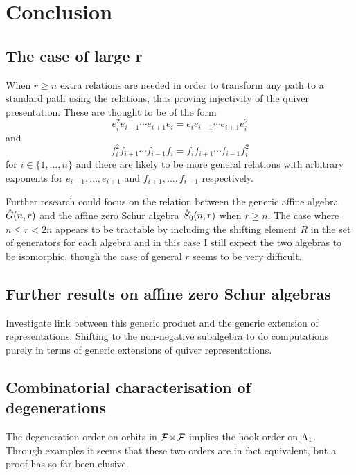 \documentclass[a4paper, 11pt]{report}
\begin{document}
\chapter{Conclusion}

\section{The case of large r}

When $r\geq n$ extra relations are needed in order to transform any path to a standard path using the relations, thus proving injectivity of the quiver presentation. These are thought to be of the form
\begin{equation*}
e_i^2e_{i-1}\cdots e_{i+1}e_i = e_ie_{i-1}\cdots e_{i+1}e_i^2
\end{equation*}
and
\begin{equation*}
f_i^2f_{i+1}\cdots f_{i-1}f_i = f_if_{i+1}\cdots f_{i-1}f_i^2
\end{equation*}
for $i\in\{1,\ldots,n\}$ and there are likely to be more general relations with arbitrary exponents for $e_{i-1},\ldots,e_{i+1}$ and $f_{i+1},\ldots,f_{i-1}$ respectively.

Further research could focus on the relation between the generic affine algebra $\hat{G}(n,r)$ and the affine zero Schur algebra $\hat{S}_0(n,r)$ when $r\geq n$. The case where $n\le r <2n$ appears to be tractable by including the shifting element $R$ in the set of generators for each algebra and in this case I still expect the two algebras to be isomorphic, though the case of general $r$ seems to be very difficult.


\section{Further results on affine zero Schur algebras}

Investigate link between this generic product and the generic extension of representations. Shifting to the non-negative subalgebra to do computations purely in terms of generic extensions of quiver representations.

\section{Combinatorial characterisation of degenerations}

The degeneration order on orbits in ${\mathcal{F}\!\times\!\mathcal{F}}$ implies the hook order on $\Lambda_1{}$. Through examples it seems that these two orders are in fact equivalent, but a proof has so far been elusive.



\nocite{*}
\printbibliography
\end{document}

